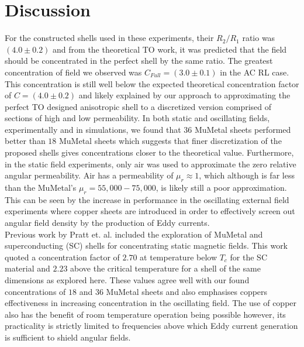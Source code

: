 \documentclass[11pt]{iopart}
\begin{document}

\section{Discussion}

For the constructed shells used in these experiments, their $R_2/R_1$
ratio was $(4.0\pm0.2)$ and from the theoretical TO work, it was
predicted that the field should be concentrated in the perfect shell
by the same ratio. The greatest concentration of field we observed was
$C_{Full} = (3.0\pm0.1)$ in the AC RL case. This concentration is
still well below the expected theoretical concentration factor of $C = (4.0
\pm 0.2)$ and likely explained by our approach to approximating the
perfect TO designed anisotropic shell to a discretized version
comprised of sections of high and low permeability.  In both static
and oscillating fields, experimentally and in simulations, we found
that $36$ MuMetal sheets performed better than $18$ MuMetal sheets
which suggests that finer discretization of the proposed shells gives
concentrations closer to the theoretical value. Furthermore, in the
static field experiments, only air was used to approximate the zero
relative angular permeability. Air has a permeability of $\mu_r
\approx 1$, which although is far less than the MuMetal's $\mu_r =
55,000-75,000 $, is likely still a poor approximation. This can be
seen by the increase in performance in the oscillating external field
experiments where copper sheets are introduced in order to effectively
screen out angular field density by the production of Eddy
currents. \\
Previous work by Pratt et. al.\cite{N2014} included the exploration of
MuMetal and superconducting (SC) shells for concentrating static
magnetic fields. This work quoted a concentration factor of $2.70$ at
temperature below $T_c$ for the SC material and $2.23$ above the
critical temperature for a shell of the same dimensions as explored
here. These values agree well with our found concentrations of $18$
and $36$ MuMetal sheets and also emphasises coppers effectiveness in
increasing concentration in the oscillating field. The use of copper
also has the benefit of room temperature operation being possible
however, its practicality is strictly limited to frequencies above
which Eddy current generation is sufficient to shield angular fields. \\
\end{document}
